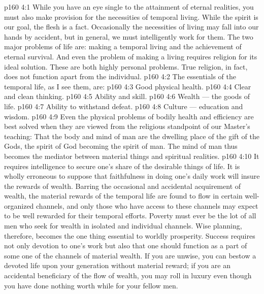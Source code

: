 \vs p160 4:1 While you have an eye single to the attainment of eternal realities, you must also make provision for the necessities of temporal living. While the spirit is our goal, the flesh is a fact. Occasionally the necessities of living may fall into our hands by accident, but in general, we must intelligently work for them. The two major problems of life are: making a temporal living and the achievement of eternal survival. And even the problem of making a living requires religion for its ideal solution. These are both highly personal problems. True religion, in fact, does not function apart from the individual.
\vs p160 4:2 \pc The essentials of the temporal life, as I see them, are:
\vs p160 4:3 \bibnobreakspace Good physical health.
\vs p160 4:4 \bibnobreakspace Clear and clean thinking.
\vs p160 4:5 \bibnobreakspace Ability and skill.
\vs p160 4:6 \bibnobreakspace Wealth --- the goods of life.
\vs p160 4:7 \bibnobreakspace Ability to withstand defeat.
\vs p160 4:8 \bibnobreakspace Culture --- education and wisdom.
\vs p160 4:9 \pc Even the physical problems of bodily health and efficiency are best solved when they are viewed from the religious standpoint of our Master’s teaching: That the body and mind of man are the dwelling place of the gift of the Gods, the spirit of God becoming the spirit of man. The mind of man thus becomes the mediator between material things and spiritual realities.
\vs p160 4:10 \pc It requires intelligence to secure one’s share of the desirable things of life. It is wholly erroneous to suppose that faithfulness in doing one’s daily work will insure the rewards of wealth. Barring the occasional and accidental acquirement of wealth, the material rewards of the temporal life are found to flow in certain well\hyp{}organized channels, and only those who have access to these channels may expect to be well rewarded for their temporal efforts. Poverty must ever be the lot of all men who seek for wealth in isolated and individual channels. Wise planning, therefore, becomes the one thing essential to worldly prosperity. Success requires not only devotion to one’s work but also that one should function as a part of some one of the channels of material wealth. If you are unwise, you can bestow a devoted life upon your generation without material reward; if you are an accidental beneficiary of the flow of wealth, you may roll in luxury even though you have done nothing worth while for your fellow men.
